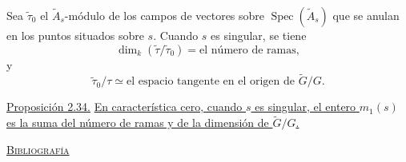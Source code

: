Sea $\widetilde\tau_0$ el $\widetilde A_s$-módulo de los campos de vectores
sobre $\operatorname{Spec}(\widetilde A_s)$ que se anulan en los puntos
situados sobre $s$. Cuando $s$ es singular, se tiene
\begin{equation*}
\dim_k(\widetilde\tau/\widetilde\tau_0)
=\text{el número de ramas},
\end{equation*}
y
\begin{equation*}
\widetilde\tau_0/\tau\simeq
\text{el espacio tangente en el origen de }\widetilde G/G.
\end{equation*}

\pageoriginale

\medskip
\noindent\underline{Proposición 2.34.}
\underline{En característica cero, cuando $s$ es singular, el entero $m_1(s)$
es la suma del número de ramas y de la dimensión de $\widetilde G/G$.}

\bigskip
\begin{center}
\underline{\textsc{Bibliografía}}
\end{center}

